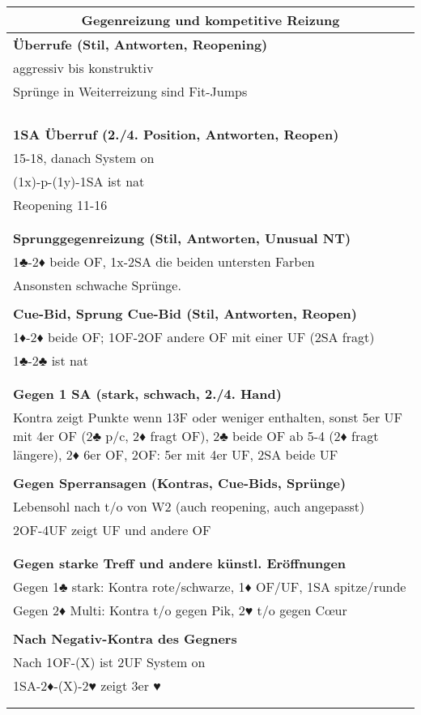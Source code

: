 \documentclass{article}
\begin{document}
\begin{multicols}{3}
\raggedcolumns

\begin{tabularx}{\columnwidth}{|X|}
\hline \multicolumn{1}{|c|}{\bf \large Gegenreizung und kompetitive Reizung} \\
\hline \bf Überrufe (Stil, Antworten, Reopening) \\
\hline aggressiv bis konstruktiv \\
 Sprünge in Weiterreizung sind Fit-Jumps \\
\\
\\
\\
\\
\hline \bf 1SA Überruf (2./4. Position, Antworten, Reopen) \\
\hline 15-18, danach System on \\
 (1x)-p-(1y)-1SA ist nat \\
 Reopening 11-16\\
\\
\\
\hline \bf Sprunggegenreizung (Stil, Antworten, Unusual NT) \\
\hline 1♣-2♦ beide OF, 1x-2SA die beiden untersten Farben \\
Ansonsten schwache Sprünge.
\\
\\
\hline \bf Cue-Bid, Sprung Cue-Bid (Stil, Antworten, Reopen) \\
\hline 1♦-2♦ beide OF; 1OF-2OF andere OF mit einer UF (2SA fragt)\\
1♣-2♣ ist nat\\
\\
\\
\hline \bf Gegen 1 SA (stark, schwach, 2./4. Hand) \\
\hline Kontra zeigt Punkte wenn 13F oder weniger enthalten, sonst 5er UF mit 4er OF (2♣ p/c, 2♦ fragt OF), 2♣ beide OF ab 5-4 (2♦ fragt längere), 2♦ 6er OF, 2OF: 5er mit 4er UF, 2SA beide UF \\
\\
\hline \bf Gegen Sperransagen (Kontras, Cue-Bids, Sprünge) \\
\hline Lebensohl nach t/o von W2 (auch reopening, auch angepasst)\\
2OF-4UF zeigt UF und andere OF\\
\\
\\
\hline \bf Gegen starke Treff und andere künstl. Eröffnungen \\
\hline Gegen 1♣ stark: Kontra rote/schwarze, 1♦ OF/UF, 1SA spitze/runde\\
Gegen 2♦ Multi: Kontra t/o gegen Pik, 2♥ t/o gegen C\oe{}ur\\
\\
\hline \bf Nach Negativ-Kontra des Gegners \\
 Nach 1OF-(X) ist 2UF System on \\
 1SA-2♦-(X)-2♥ zeigt 3er ♥ \\
\\
\\
\hline \end{tabularx}


\end{multicols}
\end{document}
